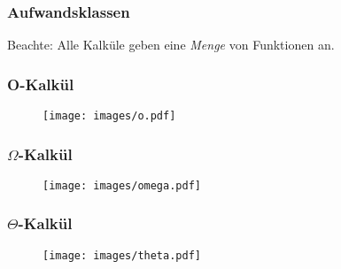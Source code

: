 \begin{frame}
			\frametitle{Aufwandsklassen}
		\begin{alertblock}{Beachte:}
		  Alle Kalküle geben eine \emph{Menge} von Funktionen an.
    \end{alertblock}
\end{frame}


\begin{frame}
  \frametitle{O-Kalkül}
  \begin{figure}[hgtb]
    \begin{center}
    \texttt{[image: images/o.pdf]}
    \end{center}
  \end{figure}
\end{frame}
\begin{frame}
  \frametitle{$\Omega$-Kalkül}
  \begin{figure}[hgtb]
    \begin{center}
    \texttt{[image: images/omega.pdf]}
    \end{center}
  \end{figure}
\end{frame}
\begin{frame}
  \frametitle{$\Theta$-Kalkül}
  \begin{figure}[hgtb]
    \begin{center}
    \texttt{[image: images/theta.pdf]}
    \end{center}
  \end{figure}
\end{frame}

